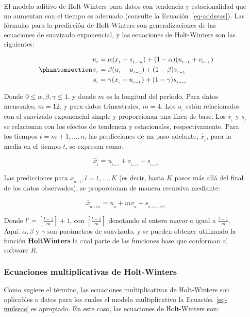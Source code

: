 \documentclass[
  us-letterpaper,
]{scrreprt}
\theoremstyle{plain}
\theoremstyle{definition}
\theoremstyle{plain}
\theoremstyle{definition}
\theoremstyle{remark}
\begin{document}
El modelo aditivo de Holt-Winters para datos con tendencia y
estacionalidad que no aumentan con el tiempo es adecuado (consulte la
Ecuación~\ref{eq-addseas}). Las fórmulas para la predicción de
Holt-Winters son generalizaciones de las ecuaciones de suavizado
exponencial, y las ecuaciones de Holt-Winters son las siguientes:

\begin{equation}\phantomsection\label{eq-extexp}{
\begin{split}
u_{_t}&= \alpha(x_{_t}-s_{_{t-m}})+(1-\alpha)(u_{_{t-1}}+v_{_{t-1}})\\
v_{_t}&= \beta(u_{_t}-u_{_{t-1}})+(1-\beta)v_{_{t-1}}\\
s_{_t}&= \gamma(x_{_t}-u_{_{t-1}})+(1-\gamma)s_{_{t-m}}
\end{split}
}\end{equation}

Donde \(0 \le \alpha, \beta, \gamma \le 1\), y donde \(m\) es la
longitud del período. Para datos mensuales, \(m = 12\), y para datos
trimestrales, \(m = 4\). Los \(u_{_t}\) están relacionados con el
suavizado exponencial simple y proporcionan una línea de base. Los
\(v_{_t}\) y \(s_{_t}\) se relacionan con los efectos de tendencia y
estacionales, respectivamente. Para los tiempos \(t= m+1,\ldots, n\),
las predicciones de un paso adelante, \(\hat{x}_{_t}\), para la media en
el tiempo \(t\), se expresan como:

\[ \hat{x}_{_t}= u_{_{t-1}}+v_{_{t-1}}+s_{_{t-m}} \]

Las predicciones para \(x_{_{n+l}}, l=1,\ldots,K\) (es decir, hasta
\(K\) pasos más allá del final de los datos observados), se proporcionan
de manera recursiva mediante:

\[
\hat{x}_{_{n+l|n}}=u_{_n}+mv_{_n}+s_{_{n+l-ml'.}}
\]

Donde \(l' =\left[ \frac{l-1}{m} \right] + 1\), con
\(\left[ \frac{l-1}{m} \right]\) denotando el entero mayor o igual a
\(\frac{l-1}{m}\). Aquí, \(\alpha, \beta\) y \(\gamma\) son parámetros
de suavizado, y se pueden obtener utilizando la función
\textbf{HoltWinters} la cual parte de las funciones base que conforman
al software \emph{R}.

\subsubsection{Ecuaciones multiplicativas de
Holt-Winters}\label{ecuaciones-multiplicativas-de-holt-winters}

Como sugiere el término, las ecuaciones multiplicativas de Holt-Winters
son aplicables a datos para los cuales el modelo multiplicativo la
Ecuación~\ref{eq-mulseas} es apropiado. En este caso, las ecuaciones de
Holt-Winters son:
\end{document}
